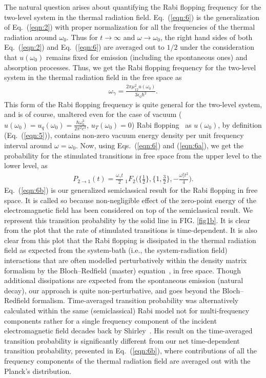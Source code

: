 \documentclass[aps,pra,twocolumn,showpacs,preprintnumbers,amsmath,amssymb,footinbib]{revtex4}
\begin{document}
The natural question arises about quantifying the Rabi flopping frequency for the two-level system in the thermal radiation field. Eq.~(\ref{eqn:6}) is the generalization of Eq.~(\ref{eqn:2}) with proper normalization for all the frequencies of the thermal radiation around $\omega_0$. Thus for $t\rightarrow\infty$ and $\omega\rightarrow\omega_0$, the right hand sides of both Eq.~(\ref{eqn:2}) and Eq.~(\ref{eqn:6}) are averaged out to $1/2$ under the consideration that $u(\omega_0)$ remains fixed for emission (including the spontaneous ones) and absorption processes. Thus, we get the Rabi flopping frequency for the two-level system in the thermal radiation field in the free space as
\begin{eqnarray}\label{eqn:6a}
\omega_\gamma=\frac{2\pi\mu_{12}^2u(\omega_0)}{3\epsilon_0\hbar^2}.
\end{eqnarray}
This form of the Rabi flopping frequency is quite general for the two-level system, and is of course, unaltered even for the case of vacuum ($u(\omega_0)=u_q(\omega_0)=\frac{\hbar\omega_0^3}{2\pi^2c^3}$, $u_T(\omega_0)=0$) Rabi flopping~\cite{Jaynes} as $u(\omega_0)$, by definition (Eq.~(\ref{eqn:5})), contains non-zero vacuum energy density per unit frequency interval around $\omega=\omega_0$. Now, using Eqs.~(\ref{eqn:6}) and (\ref{eqn:6a}), we get the probability for the stimulated transitions in free space from the upper level to the lower level, as
\begin{eqnarray}\label{eqn:6b}
P_{2\rightarrow1}(t)=\frac{\omega_\gamma t}{2}~_1F_2\big(\{\frac{1}{2}\}, \{1,\frac{3}{2}\}, -\frac{\omega_\gamma^2 t^2}{4}\big).
\end{eqnarray}
Eq.~(\ref{eqn:6b}) is our generalized semiclassical result for the Rabi flopping in free space. It is called so because non-negligible effect of the zero-point energy of the electromagnetic field has been considered on top of the semiclassical result. We represent this transition probability by the solid line in FIG. \ref{fig1b}. It is clear from the plot that the rate of stimulated transitions is {time-dependent}. It is also clear from this plot that the Rabi flopping is dissipated in the thermal radiation field as expected from the system-bath (i.e., the system-radiation field) interactions that are often modelled perturbatively within the density matrix formalism by the Bloch--Redfield (master) equation~\cite{Wollfarth,Leggett}, in free space. Though additional dissipations are expected from the spontaneous emission (natural decay), our approach is quite non-perturbative, and goes beyond the Bloch--Redfield formalism. Time-averaged {transition} probability was alternatively calculated within the same (semiclassical) Rabi model not for multi-frequency components rather for a single frequency component of the incident electromagnetic field decades back by Shirley~\cite{Shirley}. His result on the {time-averaged} transition probability is significantly different from our net time-dependent transition probability, presented in Eq.~(\ref{eqn:6b}), where contributions of all the frequency components of the thermal radiation field are averaged out with the Planck's distribution.
\end{document}
